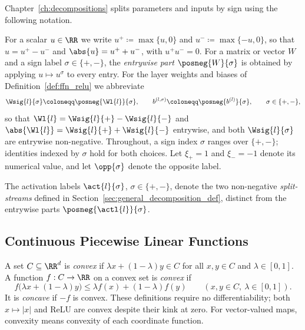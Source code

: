 Chapter~\ref{ch:decompositions} splits parameters and inputs by sign using the following notation.

\begin{definition}\label{def:posneg_parts}
For a scalar $u \in \RR$ we write $u^{+} \coloneqq \max\{u, 0\}$ and $u^{-} \coloneqq \max\{-u, 0\}$, so that $u = u^{+} - u^{-}$ and $\abs{u} = u^{+} + u^{-}$, with $u^+ u^- = 0$. For a matrix or vector $W$ and a sign label $\sigma \in \{+,-\}$, the \emph{entrywise part} $\posneg{W}{\sigma}$ is obtained by applying $u \mapsto u^{\sigma}$ to every entry. For the layer weights and biases of Definition~\ref{def:ffn_relu} we abbreviate
\begin{equation}
	\Wsig{l}{\sigma} \coloneqq \posneg{\Wl{l}}{\sigma},
	\qquad
	b^{(l,\sigma)} \coloneqq \posneg{b^{(l)}}{\sigma},
	\qquad \sigma \in \{+,-\},
	\label{eq:weight_split}
\end{equation}
so that $\Wl{l} = \Wsig{l}{+} - \Wsig{l}{-}$ and $\abs{\Wl{l}} = \Wsig{l}{+} + \Wsig{l}{-}$ entrywise, and both $\Wsig{l}{\sigma}$ are entrywise non-negative. Throughout, a sign index $\sigma$ ranges over $\{+,-\}$; identities indexed by $\sigma$ hold for both choices. Let $\xi_+=1$ and $\xi_-=-1$ denote its numerical value, and let $\opp{\sigma}$ denote the opposite label.
\end{definition}

\begin{remark}\label{rem:pair_notation}
The activation labels $\act{l}{\sigma}$, $\sigma \in \{+,-\}$, denote the two non-negative \emph{split-streams} defined in Section~\ref{sec:general_decomposition_def}, distinct from the entrywise parts $\posneg{\actl{l}}{\sigma}$.
\end{remark}

\subsection{Continuous Piecewise Linear Functions}

\begin{definition}\label{def:convexity}
A set $C\subseteq\RR^d$ is \emph{convex} if $\lambda x+(1-\lambda)y\in C$ for all $x,y\in C$ and $\lambda\in[0,1]$. A function $f:C\to\RR$ on a convex set is \emph{convex} if
\[
f\bigl(\lambda x+(1-\lambda)y\bigr)\le\lambda f(x)+(1-\lambda)f(y)
\qquad(x,y\in C,\ \lambda\in[0,1]).
\]
It is \emph{concave} if $-f$ is convex. These definitions require no differentiability; both $x\mapsto|x|$ and ReLU are convex despite their kink at zero. For vector-valued maps, convexity means convexity of each coordinate function.
\end{definition}

